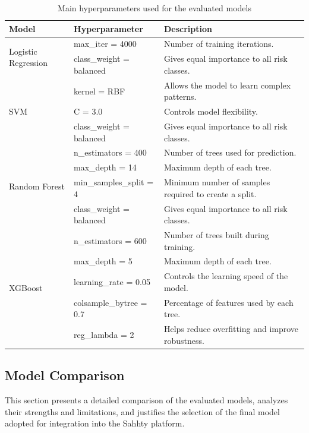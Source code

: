 \begin{table}[H]
\centering
\caption{Main hyperparameters used for the evaluated models}
\label{tab:model_hyperparameters}
\begin{tabular}{|l|l|p{7cm}|}
\hline
\textbf{Model} & \textbf{Hyperparameter} & \textbf{Description} \\
\hline

\multirow{2}{*}{Logistic Regression}
& max\_iter = 4000
& Number of training iterations. \\
\cline{2-3}
& class\_weight = balanced
& Gives equal importance to all risk classes. \\
\hline

\multirow{3}{*}{SVM}
& kernel = RBF
& Allows the model to learn complex patterns. \\
\cline{2-3}
& C = 3.0
& Controls model flexibility. \\
\cline{2-3}
& class\_weight = balanced
& Gives equal importance to all risk classes. \\
\hline

\multirow{4}{*}{Random Forest}
& n\_estimators = 400
& Number of trees used for prediction. \\
\cline{2-3}
& max\_depth = 14
& Maximum depth of each tree. \\
\cline{2-3}
& min\_samples\_split = 4
& Minimum number of samples required to create a split. \\
\cline{2-3}
& class\_weight = balanced
& Gives equal importance to all risk classes. \\
\hline

\multirow{5}{*}{XGBoost}
& n\_estimators = 600
& Number of trees built during training. \\
\cline{2-3}
& max\_depth = 5
& Maximum depth of each tree. \\
\cline{2-3}
& learning\_rate = 0.05
& Controls the learning speed of the model. \\
\cline{2-3}
& colsample\_bytree = 0.7
& Percentage of features used by each tree. \\
\cline{2-3}
& reg\_lambda = 2
& Helps reduce overfitting and improve robustness. \\
\hline

\end{tabular}
\end{table}








\subsection{Model Comparison}
This section presents a detailed comparison of the evaluated models, analyzes their strengths and limitations, and justifies the selection of the final model adopted for integration into the Sahhty platform.
